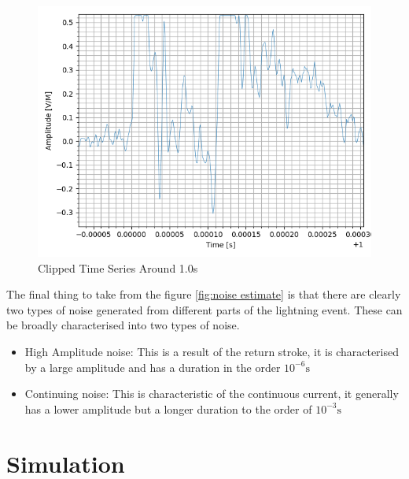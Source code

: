 \begin{figure}[h!]
    \centering
    \includegraphics[width = \textwidth]{figs/sig_character/Clipping.png}
    \caption{Clipped Time Series Around 1.0s}
    \label{fig:clipping}
\end{figure}

The final thing to take from the figure \ref{fig:noise estimate} is that there are clearly two types of noise generated from different parts of the lightning event. These can be broadly characterised into two types of noise.
\begin{itemize}
    \item High Amplitude noise: This is a result of the return stroke, it is characterised by a large amplitude and has a duration in the order $10^{-6}\si{\second}$ 
    \item Continuing noise: This is characteristic of the continuous current, it generally has a lower amplitude but a longer duration to the order of $10^{-3}\si{\second}$

\end{itemize}

\pagebreak
\section{Simulation}
